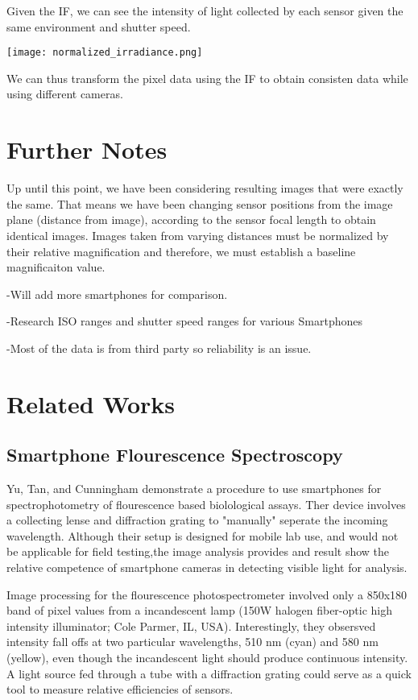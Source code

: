 \documentclass{article}
\begin{document}
Given the IF, we can see the intensity of light collected by each sensor given the same
environment and shutter speed.

\begin{center}
  \texttt{[image: normalized\_irradiance.png]}
\end{center}

We can thus transform the pixel data using the IF to obtain consisten data while using
different cameras.
\section{Further Notes}

Up until this point, we have been considering resulting images that were exactly the same. That means
we have been changing sensor positions from the image plane (distance from image), according to the
sensor focal length to obtain identical images. Images taken from varying distances must be normalized
by their relative magnification and therefore, we must establish a baseline magnificaiton value.

-Will add more smartphones for comparison.

-Research ISO ranges and shutter speed ranges for various Smartphones

-Most of the data is from third party so reliability is an issue.

\section{Related Works}

\subsection{Smartphone Flourescence Spectroscopy}
Yu, Tan, and Cunningham demonstrate a procedure to use smartphones for
spectrophotometry of flourescence based biolological assays. Ther device
involves a collecting lense and diffraction grating to "manually" seperate
the incoming wavelength. Although their setup is designed for mobile lab use, and
would not be applicable for field testing,the image analysis provides and result show
the relative competence of smartphone cameras in detecting visible light for analysis.

Image processing for the flourescence photospectrometer involved only a 850x180 band of pixel
values from a incandescent lamp (150W halogen fiber-optic high intensity illuminator; Cole Parmer, IL, USA).
Interestingly, they obsersved intensity fall offs at two particular wavelengths, 510 nm (cyan) and 580 nm (yellow),
even though the incandescent light should produce continuous intensity. A light
source fed through a tube with a diffraction grating could serve as a quick tool to
measure relative efficiencies of sensors.
\end{document}
